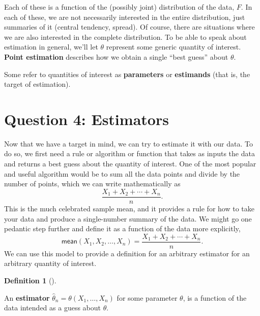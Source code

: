 \documentclass[
  letterpaper,
  DIV=11,
  numbers=noendperiod]{scrreprt}
\theoremstyle{definition}
\theoremstyle{definition}
\newtheorem{definition}{Definition}[chapter]
\theoremstyle{plain}
\theoremstyle{remark}
\begin{document}
Each of these is a function of the (possibly joint) distribution of the
data, \(F\). In each of these, we are not necessarily interested in the
entire distribution, just summaries of it (central tendency, spread). Of
course, there are situations where we are also interested in the
complete distribution. To be able to speak about estimation in general,
we'll let \(\theta\) represent some generic quantity of interest.
\textbf{Point estimation} describes how we obtain a single ``best
guess'' about \(\theta\).

\begin{tcolorbox}[enhanced jigsaw, colbacktitle=quarto-callout-note-color!10!white, breakable, toptitle=1mm, opacityback=0, leftrule=.75mm, rightrule=.15mm, coltitle=black, opacitybacktitle=0.6, toprule=.15mm, arc=.35mm, bottomtitle=1mm, titlerule=0mm, title=\textcolor{quarto-callout-note-color}{\faInfo}\hspace{0.5em}{Note}, colframe=quarto-callout-note-color-frame, bottomrule=.15mm, colback=white, left=2mm]

Some refer to quantities of interest as \textbf{parameters} or
\textbf{estimands} (that is, the target of estimation).

\end{tcolorbox}

\hypertarget{question-4-estimators}{%
\section{Question 4: Estimators}\label{question-4-estimators}}

Now that we have a target in mind, we can try to estimate it with our
data. To do so, we first need a rule or algorithm or function that takes
as inputs the data and returns a best guess about the quantity of
interest. One of the most popular and useful algorithm would be to sum
all the data points and divide by the number of points, which we can
write mathematically as \[
\frac{X_1 + X_2 + \cdots + X_n}{n}.
\] This is the much celebrated sample mean, and it provides a rule for
how to take your data and produce a single-number summary of the data.
We might go one pedantic step further and define it as a function of the
data more explicitly, \[
\textsf{mean}(X_1, X_2, \ldots, X_n) = \frac{X_1 + X_2 + \cdots + X_n}{n}.
\] We can use this model to provide a definition for an arbitrary
estimator for an arbitrary quantity of interest.

\begin{definition}[]\protect\hypertarget{def-estimator}{}\label{def-estimator}

An \textbf{estimator} \(\widehat{\theta}_n = \theta(X_1, \ldots, X_n)\)
for some parameter \(\theta\), is a function of the data intended as a
guess about \(\theta\).

\end{definition}
\end{document}
